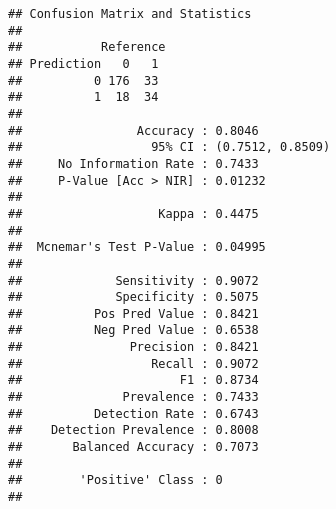 \documentclass[
]{article}
\begin{document}
\begin{verbatim}
## Confusion Matrix and Statistics
## 
##           Reference
## Prediction   0   1
##          0 176  33
##          1  18  34
##                                           
##                Accuracy : 0.8046          
##                  95% CI : (0.7512, 0.8509)
##     No Information Rate : 0.7433          
##     P-Value [Acc > NIR] : 0.01232         
##                                           
##                   Kappa : 0.4475          
##                                           
##  Mcnemar's Test P-Value : 0.04995         
##                                           
##             Sensitivity : 0.9072          
##             Specificity : 0.5075          
##          Pos Pred Value : 0.8421          
##          Neg Pred Value : 0.6538          
##               Precision : 0.8421          
##                  Recall : 0.9072          
##                      F1 : 0.8734          
##              Prevalence : 0.7433          
##          Detection Rate : 0.6743          
##    Detection Prevalence : 0.8008          
##       Balanced Accuracy : 0.7073          
##                                           
##        'Positive' Class : 0               
## 
\end{verbatim}
\end{document}

